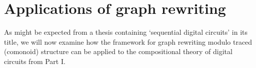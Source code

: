 \chapter{Applications of graph rewriting}



As might be expected from a thesis containing `sequential digital circuits' in
its title, we will now examine how the framework for graph rewriting modulo
traced (comonoid) structure can be applied to the compositional theory of
digital circuits from Part I.



